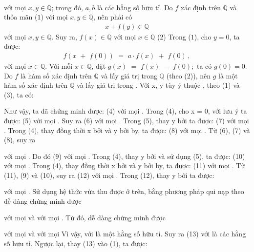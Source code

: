 \begin{multicols}{2}
{\begin{align*}
	\end{align*}
	với mọi $x,y \in \mathbb{Q}$; trong đó, $a, b$ là các hằng số hữu tỉ.
	\vskip 0.05cm
	Do $f$  xác định trên  $\mathbb{Q}$ và thỏa mãn ($1$) với mọi  $x,y \in \mathbb{Q}$, nên phải có
	\begin{align*}
		x + f(y) \in \mathbb{Q}
	\end{align*}
	với mọi  $x, y \in \mathbb{Q}$.
	\vskip 0.05cm
	Suy ra, $f(x) \in \mathbb{Q}$  với mọi $x \in \mathbb{Q}$ \hfill ($2$)
	\vskip 0.05cm
	Trong ($1$), cho $y = 0$, ta được:
	\begin{align*}
		f\left( {x\,\, + \,\,f\left( 0 \right)} \right)\,\, = \,\,a \cdot f\left( x \right)\,\, + \,\,f\left( 0 \right)\,, \tag{$3$}
	\end{align*}
	với mọi $x \in \mathbb{Q}$.
	\vskip 0.05cm
	Với mỗi  $x \in \mathbb{Q}$, đặt $g\left( x \right)\,\, = \,\,f\left( x \right)\,\, - \,\,f\left( 0 \right);$  ta có $g(0) = 0$.
	\vskip 0.05cm 
	Do $f$  là hàm số xác định trên $\mathbb{Q}$ và lấy giá trị trong  $\mathbb{Q}$ (theo ($2$)), nên $g$ là một hàm số xác định trên  $\mathbb{Q}$ và lấy giá trị trong  .
	Với x, y tùy ý thuộc  , theo (1) và (3), ta có:
	
	Như vậy, ta đã chứng minh được:
	(4)
	với mọi  .
	Trong (4), cho x = 0, với lưu ý   ta được:
	(5)
	với mọi  . Suy ra
	(6)
	với mọi  .
	Trong (5), thay y bởi   ta được:
	(7)
	với mọi  .
	Trong (4), thay đồng thời x bởi   và y bởi by, ta được:
	(8)
	với mọi  .
	Từ (6), (7) và (8), suy ra
	
	với mọi  .
	Do đó
	(9)
	với mọi  .
	Trong (4), thay y bởi   và sử dụng (5), ta được:
	(10)
	với mọi  .
	Trong (4), thay đồng thời x bởi   và y bởi by, ta được:
	(11)
	với mọi  .
	Từ (11), (9) và (10), suy ra
	(12)
	với mọi  .
	Trong (12), thay y bởi   ta được:
	
	với mọi  .
	Sử dụng hệ thức vừa thu được ở trên, bằng phương pháp qui nạp theo   dễ dàng chứng minh được
	
	với mọi   và với mọi  .
	Từ đó, dễ dàng chứng minh được
	
	với mọi   và với mọi  
	Vì vậy,   với   là một hằng số hữu tỉ.
	Suy ra
	(13)              
	với   là các hằng số hữu tỉ.
	Ngược lại, thay (13) vào (1), ta được:
	
}
\end{multicols}
